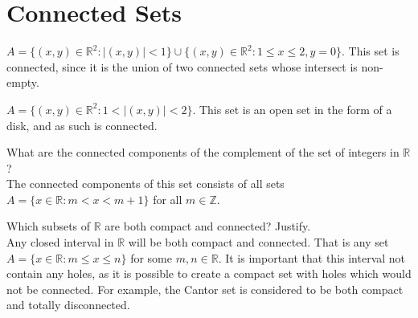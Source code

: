 \documentclass[12pt]{book}
\newcommand{\Z}{\mathbb{Z}}
\newcommand{\R}{\mathbb{R}}
\newenvironment{exercise}[2][Exercise]{\begin{trivlist}
\item[\hskip \labelsep {\bfseries #1}\hskip \labelsep {\bfseries #2.}]}{\end{trivlist}}
\begin{document}
\section{Connected Sets}

\begin{exercise}{7.5.1}
$A = \{ (x,y) \in \R^2 : |(x,y)| < 1 \} \cup \{ (x,y) \in \R^2 : 1 \leq x \leq 2, y= 0 \}.$
This set is connected, since it is the union of two connected sets whose intersect is non-empty.
\end{exercise}



\begin{exercise}{7.5.3}
$A= \{ (x,y) \in \R^2 : 1 < |(x,y)| < 2 \}$.
This set is an open set in the form of a disk, and as such is connected.
\end{exercise}



\begin{exercise}{7.5.5}
What are the connected components of the complement of the set of integers in $\R$? \\

The connected components of this set consists of all sets $A = \{ x \in \R : m < x < m+1 \}$ for all $m \in \Z$.
\end{exercise}



\begin{exercise}{7.5.7}
Which subsets of $\R$ are both compact and connected? Justify. \\

Any closed interval in $\R$ will be both compact and connected. That is any set $A= \{ x \in \R : m \leq x \leq n \}$ for some $m, n \in \R$. It is important that this interval not contain any holes, as it is possible to create a compact set with holes which would not be connected. For example,  the Cantor set is considered to be both compact and totally disconnected.
\end{exercise}
\end{document}
